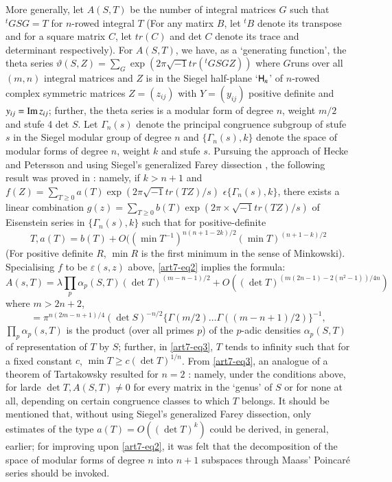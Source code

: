 More generally, let $A(S,T)$ be the number of integral matrices $G$ such that ${}^t G S G = T$ for $n$-rowed integral $T$ (For any matirx $B$, let ${}^t B$ denote its transpose and for a square matrix $C$, let $tr(C)$ and det $C$ denote its trace and determinant respectively). For $A (S, T)$, we have, as a `generating function', the theta series $\vartheta (S, Z)= \sum\limits_G \exp (2 \pi \sqrt{-1} tr ({}^t G S G Z))$ where $G$\pageoriginale runs over all $(m,n)$ integral matrices and $Z$ is in the Siegel half-plane `$\mathsf{H}_n$' of $n$-rowed complex symmetric matrices $Z = (z_{ij})$ with $Y= (y_{ij})$ positive definite and $y_{ij} = \operatorname{Im} z_{ij}$; further, the theta series is a modular form of degree $n$, weight $m/2$ and stufe 4 det $S$. Let $\Gamma_n(s)$ denote the principal congruence subgroup of stufe $s$ in the Siegel modular group of degree $n$ and $\{\Gamma_n (s), k\}$ denote the space of modular forms of degree $n$, weight $k$ and stufe $s$. Pursuing the approach of Hecke and Petersson and using Siegel's generalized Farey dissection \cite{art7-S}, the following result was proved in \cite{art7-R}: namely, if $k > n+1$ and $f(Z) = \sum\limits_{T \geq 0} a(T) \exp (2 \pi \sqrt{-1} tr (TZ)/s)$ $\epsilon \{\Gamma_n (s), k\}$, there exists a linear combination $g(z) = \sum\limits_{T \geq 0} b(T) \exp (2 \pi \times \sqrt{-1} tr (TZ)/s)$ of Eisenstein series in $\{\Gamma_n (s), k\}$ such that for positive-definite
\begin{equation*}
T, a(T) = b(T) + O((\min T^{-1})^{n(n+1-2k)/2} (\min T)^{(n+1-k)/2}\tag{2} \label{art7-eq2}
\end{equation*}
(For positive definite $R$, $\min R$ is the first minimum in the sense of Minkowski). Specialising $f$ to be $\varepsilon(s,z)$ above, \eqref{art7-eq2} implies the formula:
\begin{equation*}
A (s, T) = \lambda \prod\limits_{p} \alpha_p  (S, T) (\det T)^{(m-n-1)/2} + O ((\det T)^{(m (2n -1) -2 (n^2 -1)) / 4n})\tag{3} \label{art7-eq3}
\end{equation*}
where $m > 2 n + 2$, 
$$
= \pi^{n (2m-n+1)/4} (\det S)^{-n/2} \{\Gamma (m/2) \ldots \Gamma((m - n +1)/2)\}^{-1}, 
$$
$\prod\limits_p \alpha_p (s, T)$ is the product (over all primes $p$) of the $p$-adic densities $\alpha_p (S,T)$ of representation of $T$ by $S$; further, in \eqref{art7-eq3}, $T$ tends to infinity such that for a fixed constant $c$, $\min T \geqslant c (\det T)^{1/n}$. From \eqref{art7-eq3}, an analogue of a theorem of Tartakowsky resulted for $n = 2$ \cite{art7-R}: namely, under the conditions above, for larde $\det T, A (S, T) \neq 0$ for every matrix in the `genus' of $S$ or for none at all, depending on certain congruence classes to which $T$ belongs. It should be mentioned that, without using Siegel's generalized Farey dissection, only estimates of the type $a (T) = O((\det T)^k)$ could be derived, in general, earlier; for improving upon \eqref{art7-eq2}, it was felt that the decomposition of the space of modular forms of degree $n$ into $n+1$ subspaces through Maass' Poincar\'e series should be invoked. 

